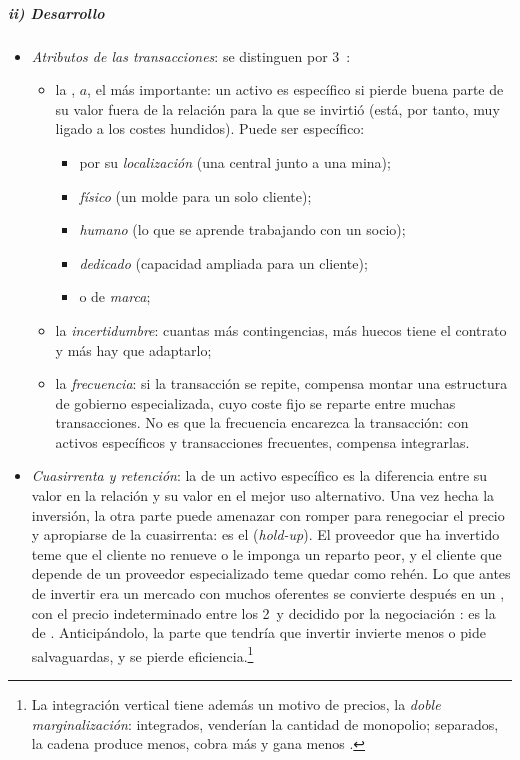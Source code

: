 \documentclass[11pt]{article}
\begin{document}
\subparagraph{ii) Desarrollo}

\begin{itemize}
\item \emph{Atributos de las transacciones}: se distinguen por 3~\nocite{Williamson1979Transaction}:
  \begin{itemize}
  \item la , $a$, el más importante: un activo es específico si pierde buena parte de su valor fuera de la relación para la que se invirtió (está, por tanto, muy ligado a los costes hundidos). Puede ser específico:
    \begin{itemize}
    \item por su \emph{localización} (una central junto a una mina);
    \item \emph{físico} (un molde para un solo cliente);
    \item \emph{humano} (lo que se aprende trabajando con un socio);
    \item \emph{dedicado} (capacidad ampliada para un cliente);
    \item o de \emph{marca};
    \end{itemize}
  \item la \emph{incertidumbre}: cuantas más contingencias, más huecos tiene el contrato y más hay que adaptarlo;
  \item la \emph{frecuencia}: si la transacción se repite, compensa montar una estructura de gobierno especializada, cuyo coste fijo se reparte entre muchas transacciones. No es que la frecuencia encarezca la transacción: con activos específicos y transacciones frecuentes, compensa integrarlas.
  \end{itemize}
\item \emph{Cuasirrenta y retención}: la  de un activo específico es la diferencia entre su valor en la relación y su valor en el mejor uso alternativo\nocite{KleinCrawfordAlchian1978Vertical}. Una vez hecha la inversión, la otra parte puede amenazar con romper para renegociar el precio y apropiarse de la cuasirrenta: es el  (\emph{hold-up}). El proveedor que ha invertido teme que el cliente no renueve o le imponga un reparto peor, y el cliente que depende de un proveedor especializado teme quedar como rehén. Lo que antes de invertir era un mercado con muchos oferentes se convierte después en un , con el precio indeterminado entre los 2~y decidido por la negociación : es la  de \textcite{Williamson1985Economic}. Anticipándolo, la parte que tendría que invertir invierte menos o pide salvaguardas, y se pierde eficiencia.\footnote{La integración vertical tiene además un motivo de precios, la \emph{doble marginalización}\nocite{Spengler1950Vertical}: integrados, venderían la cantidad de monopolio; separados, la cadena produce menos, cobra más y gana menos .}

\end{itemize}
\end{document}
